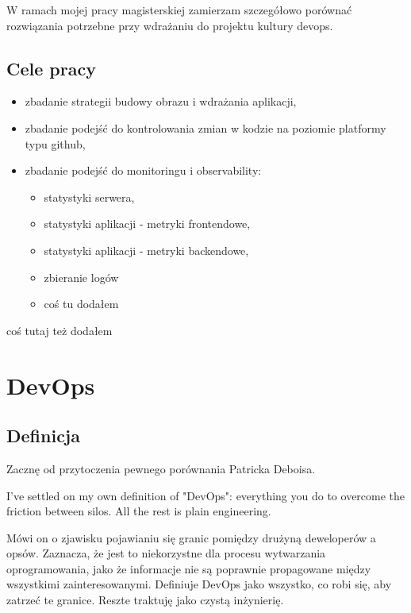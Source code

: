 \documentclass{article}
\begin{document}
W ramach mojej pracy magisterskiej zamierzam szczegółowo porównać rozwiązania potrzebne przy wdrażaniu do projektu kultury devops.

\subsection{Cele pracy}

\begin{itemize}
    \item zbadanie strategii budowy obrazu i wdrażania aplikacji,
    \item zbadanie podejść do kontrolowania zmian w kodzie na poziomie platformy typu github,
    \item zbadanie podejść do monitoringu i observability:
    \begin{itemize}
        \item statystyki serwera,
        \item statystyki aplikacji - metryki frontendowe,
        \item statystyki aplikacji - metryki backendowe,
        \item zbieranie logów
        \item coś tu dodałem
    \end{itemize}
\end{itemize}


coś tutaj też dodałem


\section {DevOps}
\subsection{Definicja}

Zacznę od przytoczenia pewnego porównania Patricka Deboisa\cite{devOpsHandbook}.

\begin{displayquote}
    I've settled on my own definition of "DevOps": everything you do to overcome the friction between silos. All the rest is plain engineering.
\end{displayquote}

Mówi on o zjawisku pojawianiu się granic pomiędzy drużyną deweloperów a opsów. Zaznacza, że jest to niekorzystne dla procesu wytwarzania oprogramowania, jako że informacje nie są poprawnie propagowane między wszystkimi zainteresowanymi. Definiuje DevOps jako wszystko, co robi się, aby zatrzeć te granice. Reszte traktuję jako czystą inżynierię.
\newline
\end{document}
